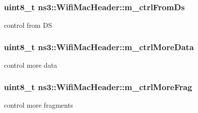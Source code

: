 \subsubsection[{\texorpdfstring{m\+\_\+ctrl\+From\+Ds}{m_ctrlFromDs}}]{\setlength{\rightskip}{0pt plus 5cm}uint8\+\_\+t ns3\+::\+Wifi\+Mac\+Header\+::m\+\_\+ctrl\+From\+Ds\hspace{0.3cm}{\ttfamily [private]}}\hypertarget{classns3_1_1WifiMacHeader_a79823b56ff5dc9e5f65db3a712be83eb}{}\label{classns3_1_1WifiMacHeader_a79823b56ff5dc9e5f65db3a712be83eb}


control from DS 

\subsubsection[{\texorpdfstring{m\+\_\+ctrl\+More\+Data}{m_ctrlMoreData}}]{\setlength{\rightskip}{0pt plus 5cm}uint8\+\_\+t ns3\+::\+Wifi\+Mac\+Header\+::m\+\_\+ctrl\+More\+Data\hspace{0.3cm}{\ttfamily [private]}}\hypertarget{classns3_1_1WifiMacHeader_a9535838e3b645c3c9cf3c73aa5330309}{}\label{classns3_1_1WifiMacHeader_a9535838e3b645c3c9cf3c73aa5330309}


control more data 

\subsubsection[{\texorpdfstring{m\+\_\+ctrl\+More\+Frag}{m_ctrlMoreFrag}}]{\setlength{\rightskip}{0pt plus 5cm}uint8\+\_\+t ns3\+::\+Wifi\+Mac\+Header\+::m\+\_\+ctrl\+More\+Frag\hspace{0.3cm}{\ttfamily [private]}}\hypertarget{classns3_1_1WifiMacHeader_ae28621d3a24ef654c60177661f0118aa}{}\label{classns3_1_1WifiMacHeader_ae28621d3a24ef654c60177661f0118aa}


control more fragments 

